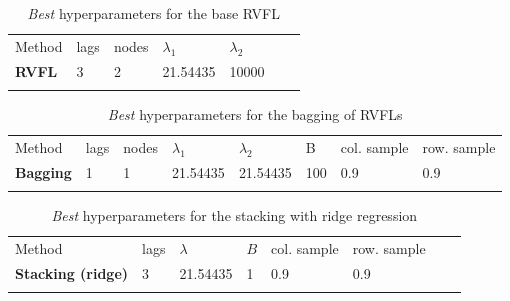 \begin{table}[!htb]
\begin{center}
\caption{\textit{Best} hyperparameters for the base RVFL}
\label{tab:bestparamsrvfl}       %
\begin{tabular}{lllllll}
\hline\noalign{\smallskip}
Method & lags & nodes & $\lambda_1$ & $\lambda_2$ &   &   \\
\noalign{\smallskip}\hline\noalign{\smallskip}
  \textbf{RVFL} & 3 & 2 & 21.54435 & 10000 &  &  \\
\noalign{\smallskip}\hline
\end{tabular}
\end{center}
\end{table}

\begin{table}[!htb]
\begin{center}
\caption{\textit{Best} hyperparameters for the bagging of RVFLs}
\label{tab:bestparamsbagrvfl}       %
\begin{tabular}{llllllll}
\hline\noalign{\smallskip}
Method & lags & nodes & $\lambda_1$ & $\lambda_2$ & B  &  col. sample  & row. sample\\
\noalign{\smallskip}\hline\noalign{\smallskip}
  \textbf{Bagging} & 1 & 1 & 21.54435 & 21.54435 & 100 & 0.9 & 0.9\\
\noalign{\smallskip}\hline
\end{tabular}
\end{center}
\end{table}

\begin{table}[!htb]
\begin{center}
\caption{\textit{Best} hyperparameters for the stacking with ridge regression}
\label{tab:bestparamsbagrvfl}       %
\begin{tabular}{llllllll}
\hline\noalign{\smallskip}
Method & lags & $\lambda$ & $B$ & col. sample  &  row. sample  \\
\noalign{\smallskip}\hline\noalign{\smallskip}
  \textbf{Stacking (ridge)} & 3 & 21.54435 &  1 & 0.9 & 0.9   \\
\noalign{\smallskip}\hline
\end{tabular}
\end{center}
\end{table}

